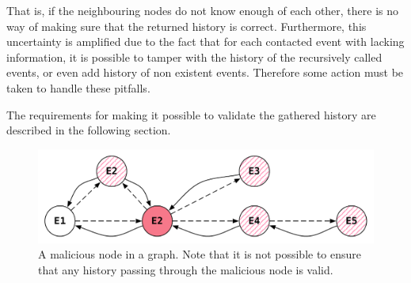 	\newpar That is, if the neighbouring nodes do not know enough of each other, there is no way of making sure that the returned history is correct. Furthermore, this uncertainty is amplified due to the fact that for each contacted event with lacking information, it is possible to tamper with the history of the recursively called events, or even add history of non existent events. Therefore some action must be taken to handle these pitfalls.
	
	The requirements for making it possible to validate the gathered history are described in the following section. 
	
	\begin{figure}[H]
		\centering
		\includegraphics[width=\textwidth]{4connect/images/recursive-evil-node.pdf}
		\caption{A malicious node in a graph. Note that it is not possible to ensure that any history passing through the malicious node is valid.}
		\label{fig:connecting:recursive-evil-node}
	\end{figure}